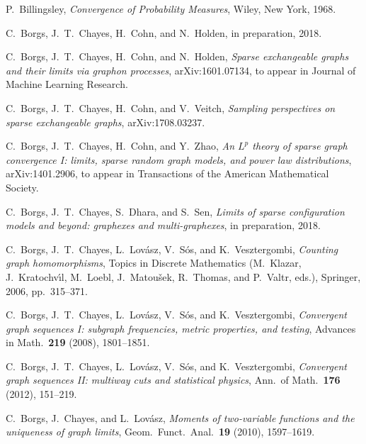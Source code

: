 \documentclass{amsart}
\def\MR#1{\href{http://www.ams.org/mathscinet-getitem?mr=#1}{MR#1}}
\def\arXiv#1{arXiv:\href{http://arXiv.org/abs/#1}{#1}}
\numberwithin{equation}{section}
\numberwithin{figure}{section}
\theoremstyle{definition}
\theoremstyle{remark}
\begin{document}
\providecommand{\bysame}{\leavevmode\hbox to3em{\hrulefill}\thinspace}
\providecommand{\MR}{\relax\ifhmode\unskip\space\fi MR }
\providecommand{\MRhref}[2]{\href{http://www.ams.org/mathscinet-getitem?mr=#1}{#2}}
\providecommand{\href}[2]{#2}
\begin{thebibliography}{10}

 P.~Billingsley, \emph{Convergence of Probability Measures},
 Wiley, New York, 1968.

 C.~{Borgs}, J.~T.~{Chayes}, H.~{Cohn}, and N.~{Holden}, in
 preparation, 2018.

 C.~{Borgs}, J.~T.~{Chayes}, H.~{Cohn}, and N.~{Holden},
 \emph{Sparse
 exchangeable graphs and their limits via graphon processes},
 \arXiv{1601.07134}, to appear in Journal of Machine Learning Research.

 C.~{Borgs}, J.~T.~{Chayes}, H.~{Cohn}, and V.~{Veitch},
 \emph{Sampling
 perspectives on sparse exchangeable graphs}, \arXiv{1708.03237}.

 C.~Borgs, J.~T.~Chayes, H.~Cohn, and Y.~Zhao, \emph{An $L^p$
 theory of sparse
 graph convergence I: limits, sparse random graph models, and power law
 distributions}, \arXiv{1401.2906}, to appear in Transactions of the American
 Mathematical Society.

 C.~{Borgs}, J.~T.~{Chayes}, S.~{Dhara}, and S.~{Sen},
 \emph{Limits of sparse
 configuration models and beyond: graphexes and multi-graphexes}, in
 preparation, 2018.

 C.~Borgs, J.~T.~Chayes, L.~Lov\'{a}sz, V.~S\'{o}s, and
 K.~Vesztergombi,
 \emph{Counting graph homomorphisms}, Topics in Discrete Mathematics
 (M.~Klazar, J.~Kratochv\'{\i}l, M.~Loebl, J.~Matou\v{s}ek, R.~Thomas, and
 P.~Valtr, eds.), Springer, 2006, pp.~315--371.

 C.~Borgs, J.~T.~Chayes, L.~Lov\'{a}sz, V.~S\'{o}s, and
 K.~Vesztergombi,
 \emph{Convergent graph sequences I: subgraph frequencies, metric
 properties, and testing}, Advances in Math.\ \textbf{219} (2008), 1801--1851.

 C.~Borgs, J.~T.~Chayes, L.~Lov\'{a}sz, V.~S\'{o}s, and
 K.~Vesztergombi,
 \emph{Convergent graph sequences II: multiway cuts and statistical
 physics}, Ann.\ of Math.\ \textbf{176} (2012), 151--219.

 C.~Borgs, J.~Chayes, and L.~Lov{\'a}sz, \emph{Moments of
 two-variable functions
 and the uniqueness of graph limits}, Geom.\ Funct.\ Anal.\ \textbf{19} (2010),
 1597--1619.


\end{thebibliography}
\end{document}
